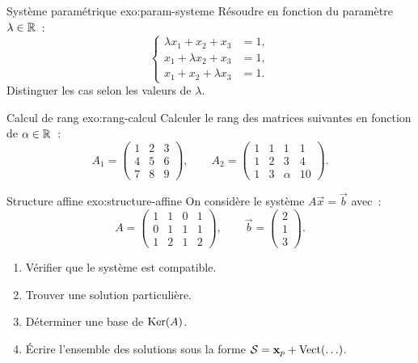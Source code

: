 \begin{exercise}{Système paramétrique \intermediate}{exo:param-systeme}
  Résoudre en fonction du paramètre $\lambda\in{\mathbb{R}}$~:
  \[
    \left\{
    \begin{aligned}
      \lambda x_1 + x_2 + x_3 &= 1,\\
      x_1 + \lambda x_2 + x_3 &= 1,\\
      x_1 + x_2 + \lambda x_3 &= 1.
    \end{aligned}
    \right.
  \]
  Distinguer les cas selon les valeurs de $\lambda$.
\end{exercise}

\begin{exercise}{Calcul de rang \intermediate}{exo:rang-calcul}
  Calculer le rang des matrices suivantes en fonction de $\alpha\in{\mathbb{R}}$~:
  \[
    A_1=\begin{pmatrix}
      1 & 2 & 3\\
      4 & 5 & 6\\
      7 & 8 & 9
    \end{pmatrix},\qquad
    A_2=\begin{pmatrix}
      1 & 1 & 1 & 1\\
      1 & 2 & 3 & 4\\
      1 & 3 & \alpha & 10
    \end{pmatrix}.
  \]
\end{exercise}

\begin{exercise}{Structure affine \intermediate}{exo:structure-affine}
  On considère le système $A\vec{x}=\vec{b}$ avec~:
  \[
    A=\begin{pmatrix}1&1&0&1\\0&1&1&1\\1&2&1&2\end{pmatrix},\qquad
    \vec{b}=\begin{pmatrix}2\\1\\3\end{pmatrix}.
  \]
  \begin{enumerate}[label=(\alph*)]
    \item Vérifier que le système est compatible.
    \item Trouver une solution particulière.
    \item Déterminer une base de $\operatorname{Ker}(A)$.
    \item Écrire l'ensemble des solutions sous la forme
      ${\mathcal{S}}=\mathbf{x}_p+\operatorname{Vect}(\ldots)$.
  \end{enumerate}
\end{exercise}

